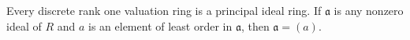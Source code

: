 Every discrete rank one valuation ring is a principal ideal ring. If $\mathfrak{a}$ is any nonzero ideal of $R$ and $a$ is an element of least order in $\mathfrak{a}$, then $\mathfrak{a} = (a)$.
